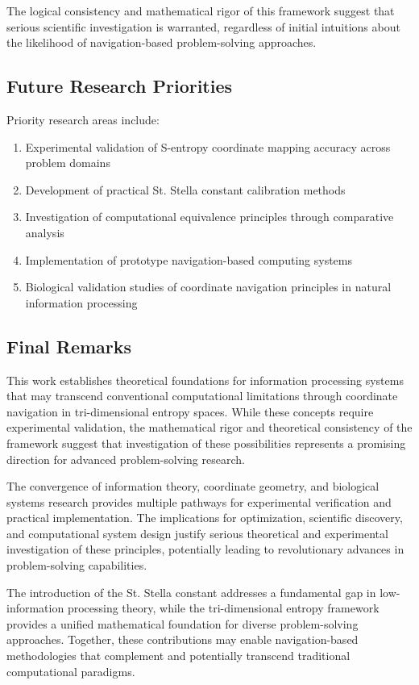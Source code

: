 \documentclass[11pt]{article}
\begin{document}
The logical consistency and mathematical rigor of this framework suggest that serious scientific investigation is warranted, regardless of initial intuitions about the likelihood of navigation-based problem-solving approaches.

\subsection{Future Research Priorities}

Priority research areas include:

\begin{enumerate}
\item Experimental validation of S-entropy coordinate mapping accuracy across problem domains
\item Development of practical St. Stella constant calibration methods
\item Investigation of computational equivalence principles through comparative analysis
\item Implementation of prototype navigation-based computing systems
\item Biological validation studies of coordinate navigation principles in natural information processing
\end{enumerate}

\subsection{Final Remarks}

This work establishes theoretical foundations for information processing systems that may transcend conventional computational limitations through coordinate navigation in tri-dimensional entropy spaces. While these concepts require experimental validation, the mathematical rigor and theoretical consistency of the framework suggest that investigation of these possibilities represents a promising direction for advanced problem-solving research.

The convergence of information theory, coordinate geometry, and biological systems research provides multiple pathways for experimental verification and practical implementation. The implications for optimization, scientific discovery, and computational system design justify serious theoretical and experimental investigation of these principles, potentially leading to revolutionary advances in problem-solving capabilities.

The introduction of the St. Stella constant addresses a fundamental gap in low-information processing theory, while the tri-dimensional entropy framework provides a unified mathematical foundation for diverse problem-solving approaches. Together, these contributions may enable navigation-based methodologies that complement and potentially transcend traditional computational paradigms.
\end{document}
